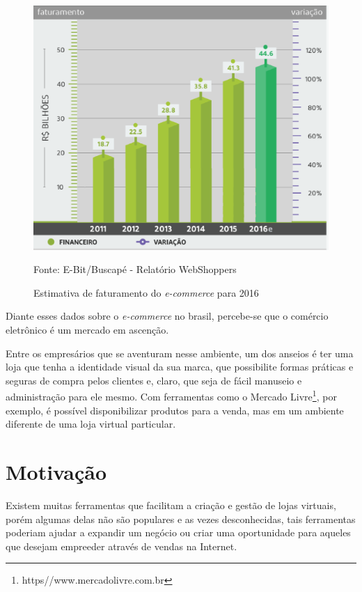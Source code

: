 \documentclass[a4paper,12pt]{monografia}
\begin{document}
\begin{figure}[H]
\centering
\includegraphics[width=12cm]{img/webshoppers/estimativa-faturamento.eps}
\caption{Estimativa de faturamento do \textit{e-commerce} para 2016}
\small{Fonte: E-Bit/Buscapé - Relatório WebShoppers}
\label{figura:estimativa:faturamento}
\end{figure}

Diante esses dados sobre o \textit{e-commerce} no brasil, percebe-se que o comércio eletrônico é um mercado em ascenção.

Entre os empresários que se aventuram nesse ambiente, um dos anseios é ter uma loja que tenha a identidade visual da sua marca, que possibilite formas práticas e seguras de compra pelos clientes e, claro, que seja de fácil manuseio e administração para ele mesmo. Com ferramentas como o Mercado Livre\footnote{https//www.mercadolivre.com.br}, por exemplo, é possível disponibilizar produtos para a venda, mas em um ambiente diferente de uma loja virtual particular.

\section{Motivação} %
\label{sec:motivacao}

Existem muitas ferramentas que facilitam a criação e gestão de lojas virtuais, porém algumas delas não são populares e as vezes desconhecidas, tais ferramentas poderiam ajudar a expandir um negócio ou criar uma oportunidade para aqueles que desejam empreeder através de vendas na Internet. 
\end{document}
